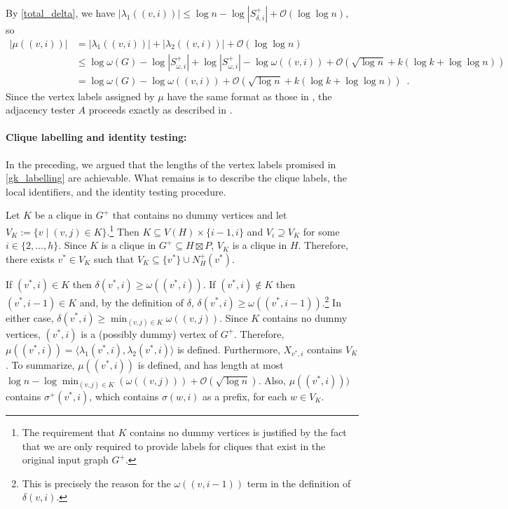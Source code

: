 \documentclass{patmorin}
\let\eqref\cref
\renewcommand{\ge}{\geqslant}
\renewcommand{\le}{\leqslant}
\newcommand{\Oh}{\mathcal{O}}
\begin{document}
  By \eqref{total_delta}, we have $|\lambda_1((v,i))|\le \log n - \log |S^+_{\delta,i}| + \Oh(\log\log n)$, so
  \begin{align*}
     |\mu((v,i))| & =
     |\lambda_1((v,i))|+|\lambda_2((v,i))| + \Oh(\log\log n) \\
     & \le \log\omega(G) - \log |S^+_{\omega,i}|
      + \log |S^+_{\omega,i}|-\log \omega((v,i)) + \Oh(\sqrt{\log n} + k(\log k+\log\log n)) \\
     & = \log\omega(G) - \log\omega((v,i)) + \Oh(\sqrt{\log n} + k(\log k+\log\log n)) \enspace .
  \end{align*}
  Since the vertex labels assigned by $\mu$ have the same format as those in \cite{alstrup.dahlgaard.ea:optimal,dujmovic.esperet.ea:adjacency}, the adjacency tester $A$ proceeds exactly as described in \cite{alstrup.rauhe:improved,dujmovic.esperet.ea:adjacency}.

  \paragraph{Clique labelling and identity testing:}
  In the preceding, we argued that the lengths of the vertex labels promised in \cref{gk_labelling} are achievable.
  What remains is to describe the clique labels, the local identifiers, and the identity testing procedure.

  Let $K$ be a clique in $G^+$ that contains no dummy vertices and let $V_K:=\{v\mid (v,j)\in K\}$.\footnote{The requirement that $K$ contains no dummy vertices is justified by the fact that we are only required to provide labels for cliques that exist in the original input graph $G^+$.}
  Then $K\subseteq V(H)\times\{i-1,i\}$  and $V_i\supseteq V_K$ for some $i\in\{2,\ldots,h\}$.  Since $K$ is a clique in $G^+\subseteq H\boxtimes P$, $V_K$ is a clique in $H$.  Therefore, there exists $v^*\in V_K$ such that $V_K\subseteq \{v^*\}\cup N^+_H(v^*)$.

  If $(v^*,i)\in K$ then $\delta(v^*,i)\ge \omega((v^*,i))$.
  If $(v^*,i)\not\in K$ then $(v^*,i-1)\in K$ and, by the definition of $\delta$, $\delta(v^*,i)\ge \omega((v^*,i-1))$.\footnote{This is precisely the reason for the $\omega((v,i-1))$ term in the definition of $\delta(v,i)$.}  In either case, $\delta(v^*,i)\ge\min_{(v,j)\in K}\omega((v,j))$.  Since $K$ contains no dummy vertices, $(v^*,i)$ is a (possibly dummy) vertex of $G^+$.  Therefore, $\mu((v^*,i))=\langle \lambda_1(v^*,i),\lambda_2(v^*,i)\rangle$ is defined.  Furthermore, $X_{v^*,i}$ contains $V_K$.  To summarize, $\mu((v^*,i))$ is defined, and has length at most $\log n - \log\min_{(v,j)\in K}(\omega((v,j))) + \Oh(\sqrt{\log n})$.  Also, $\mu((v^*,i)))$ contains $\sigma^+(v^*,i)$, which contains $\sigma(w,i)$ as a prefix, for each $w\in V_K$.
\end{document}
